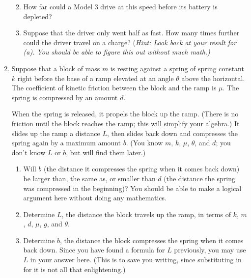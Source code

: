 \documentclass[12pt]{article}
\begin{document}
\begin{enumerate}
\begin{enumerate}
	\vspace{1.5in}
	
	\item How far could a Model 3 drive at this speed before its battery is depleted?
		\vspace{1.5in}
	\item Suppose that the driver only went half as fast. How many times further could the driver travel on a charge? (\it Hint: Look back at your result for (a). You should be able to figure this out without much math.)\rm
	
	
\end{enumerate}	

\newpage

\item Suppose that a block of mass $m$ is resting against a spring of spring constant $k$ right before the base of a 
ramp elevated at an angle $\theta$ above the horizontal. The coefficient of kinetic friction between the block and the ramp is $\mu$. The spring is compressed by an amount $d$. 

When the spring is released, it propels the block up the ramp. (There is no friction until the block reaches the ramp; this will simplify your algebra.) It slides up the ramp a distance $L$,
then slides back down and compresses the spring again by a maximum amount $b$. (You know $m$, $k$, $\mu$, $\theta$, and $d$; you don't know $L$ or $b$, but will find them later.)

\begin{enumerate}
	\item Will $b$ (the distance it compresses the spring when it comes back down) be larger than, the same as, or smaller than $d$ (the distance the spring was compressed in the beginning)? You should be able to make a logical argument here without doing any mathematics.
	\newpage
	
	\item Determine $L$, the distance the block travels up the ramp, in terms of $k$, $m$, $d$, $\mu$, $g$, and $\theta$.
	
	\vspace{3.3in}
	
	\item Determine $b$, the distance the block compresses the spring when it comes back down. Since you have found a formula for $L$ previously, you may use $L$ in your answer here. (This is to save you writing, since substituting in for it is not all that enlightening.)
	
\end{enumerate}
\end{enumerate}





	
\end{document}
